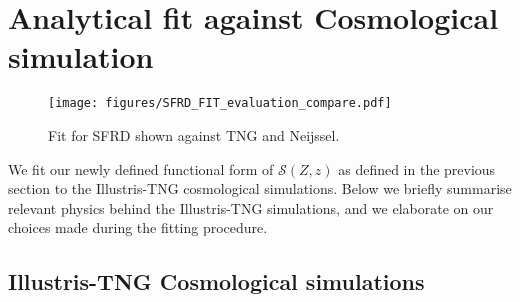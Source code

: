 \documentclass[twocolumn]{aastex631}
\newcommand{\SFRDzZ}{\ensuremath{\mathcal{S}(Z,z)}\xspace}
\begin{document}
\section{Analytical fit against Cosmological simulation}

\begin{figure*}
\texttt{[image: figures/SFRD\_FIT\_evaluation\_compare.pdf]}
\caption{Fit for SFRD shown against TNG and Neijssel.  \label{fig: fit SFRD}}
\end{figure*}
We fit our newly defined functional form of \SFRDzZ as defined in the previous section to the Illustris-TNG cosmological simulations. Below we briefly summarise relevant physics behind the Illustris-TNG simulations, and we elaborate on our choices made during the fitting procedure.



\subsection{Illustris-TNG Cosmological simulations}
\end{document}
